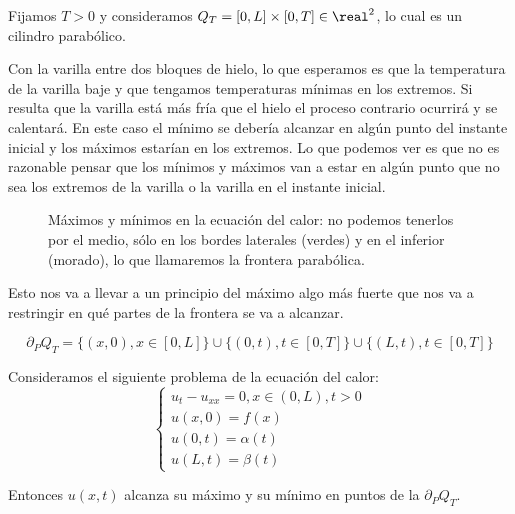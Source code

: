 	 Fijamos $T > 0$ y consideramos $Q_T = [0,L]\times [0,T] \in \real^2$, lo cual es un cilindro parabólico.

	 Con la varilla entre dos bloques de hielo, lo que esperamos es que la temperatura de la varilla baje y que tengamos temperaturas mínimas en los extremos. Si resulta que la varilla está más fría que el hielo el proceso contrario ocurrirá y se calentará. En este caso el mínimo se debería alcanzar en algún punto del instante inicial y los máximos estarían en los extremos. Lo que podemos ver es que no es razonable pensar que los mínimos y máximos van a estar en algún punto que no sea los extremos de la varilla o la varilla en el instante inicial.

	 \begin{figure}[hbtp]
	 \centering
	 \caption{Máximos y mínimos en la ecuación del calor: no podemos tenerlos por el medio, sólo en los bordes laterales (verdes) y en el inferior (morado), lo que llamaremos la frontera parabólica.}
	 \label{fig:EcCalorMaximosMinimos}
	 \end{figure}

	 Esto nos va a llevar a un principio del máximo algo más fuerte que nos va a restringir en qué partes de la frontera se va a alcanzar.

	 \begin{defn} \label{def:FronteraParabolica}
	 	\[\partial_P Q_T = \{(x,0), x \in [0,L]\} \cup \{(0,t), t \in [0,T]\} \cup \{(L,t), t \in [0,T]\}\]
	 \end{defn}

	 \begin{theorem} \label{thm:MaximoDebilCalor} Consideramos el siguiente problema de la ecuación del calor:
	 	\[ \begin{cases}
	 		u_{t} - u_{xx} = 0, x \in (0,L), t > 0 \\
			u(x,0) = f(x) \\
			u(0,t) = \alpha(t) \\
			u(L,t) = \beta(t)
	 	\end{cases}\]

	 	Entonces $u(x,t)$ alcanza su máximo y su mínimo en puntos de la  $\partial_P Q_T$.
	 \end{theorem}

